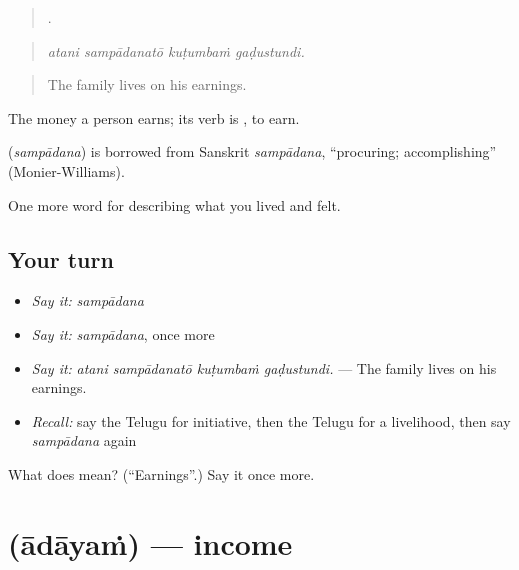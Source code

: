 \begin{quote}
   .
\end{quote}

\begin{quote}
\emph{atani sampādanatō kuṭumbaṁ gaḍustundi.}
\end{quote}

\begin{quote}
The family lives on his earnings.
\end{quote}

The money a person earns; its verb is , to earn.

\begin{cousinweb}
\textbf{} (\emph{sampādana}) is borrowed from Sanskrit \emph{sampādana}, \textquotedblleft{}procuring; accomplishing\textquotedblright{} (Monier-Williams).
\end{cousinweb}

\begin{grammarlens}[title={What you've built}]
One more word for describing what you lived and felt.
\end{grammarlens}

\subsection*{Your turn}
\begin{itemize}
\raggedright
  \item \emph{Say it:} \emph{sampādana}
  \item \emph{Say it:} \emph{sampādana}, once more
  \item \emph{Say it:} \emph{atani sampādanatō kuṭumbaṁ gaḍustundi.} — The family lives on his earnings.
  \item \emph{Recall:} say the Telugu for initiative, then the Telugu for a livelihood, then say \emph{sampādana} again
\end{itemize}

\begin{tcolorbox}[breakable,colback=teal!4,colframe=teal!35!black,title={Before you move on}]
What does  mean? (\textquotedblleft{}Earnings\textquotedblright{}.) Say it once more.
\end{tcolorbox}
\section[\texorpdfstring{\te{ఆదాయం} (ādāyaṁ)}{ఆదాయం (ādāyaṁ)}]{ (ādāyaṁ) — income}

